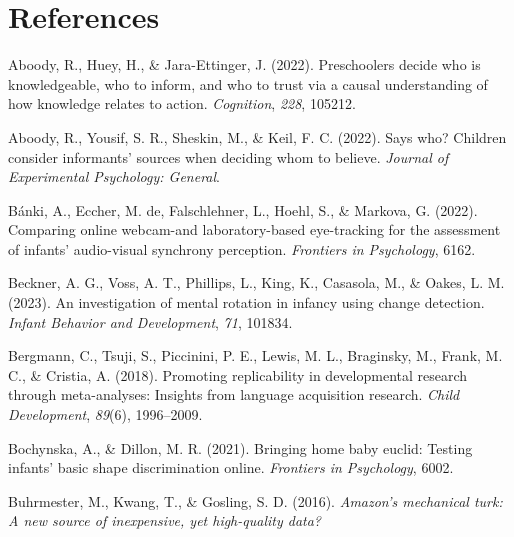 \documentclass[
  man,floatsintext]{apa6}
\newlength{\cslhangindent}
\newlength{\cslentryspacingunit} %
\newenvironment{CSLReferences}[2] %
 {%
  \setlength{\parindent}{0pt}
  \ifodd #1
  \let\oldpar\par
  \def\par{\hangindent=\cslhangindent\oldpar}
  \fi
  \setlength{\parskip}{#2\cslentryspacingunit}
 }%
 {}
\begin{document}
\newpage

\hypertarget{references}{%
\section{References}\label{references}}

\hypertarget{refs}{}
\begin{CSLReferences}{1}{0}
\leavevmode{}%
Aboody, R., Huey, H., \& Jara-Ettinger, J. (2022). Preschoolers decide who is knowledgeable, who to inform, and who to trust via a causal understanding of how knowledge relates to action. \emph{Cognition}, \emph{228}, 105212.

\leavevmode{}%
Aboody, R., Yousif, S. R., Sheskin, M., \& Keil, F. C. (2022). Says who? Children consider informants' sources when deciding whom to believe. \emph{Journal of Experimental Psychology: General}.

\leavevmode{}%
Bánki, A., Eccher, M. de, Falschlehner, L., Hoehl, S., \& Markova, G. (2022). Comparing online webcam-and laboratory-based eye-tracking for the assessment of infants' audio-visual synchrony perception. \emph{Frontiers in Psychology}, 6162.

\leavevmode{}%
Beckner, A. G., Voss, A. T., Phillips, L., King, K., Casasola, M., \& Oakes, L. M. (2023). An investigation of mental rotation in infancy using change detection. \emph{Infant Behavior and Development}, \emph{71}, 101834.

\leavevmode{}%
Bergmann, C., Tsuji, S., Piccinini, P. E., Lewis, M. L., Braginsky, M., Frank, M. C., \& Cristia, A. (2018). Promoting replicability in developmental research through meta-analyses: Insights from language acquisition research. \emph{Child Development}, \emph{89}(6), 1996--2009.

\leavevmode{}%
Bochynska, A., \& Dillon, M. R. (2021). Bringing home baby euclid: Testing infants' basic shape discrimination online. \emph{Frontiers in Psychology}, 6002.

\leavevmode{}%
Buhrmester, M., Kwang, T., \& Gosling, S. D. (2016). \emph{Amazon's mechanical turk: A new source of inexpensive, yet high-quality data?}


\end{CSLReferences}
\end{document}
